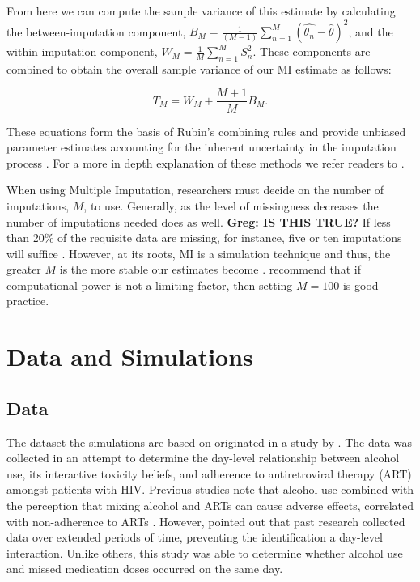 \documentclass{svjour3}\usepackage[]{graphicx}\usepackage[]{color}
\begin{document}
From here we can compute the sample variance of this estimate by calculating the between-imputation component, $B_M = \frac{1}{(M-1)}\sum_{n=1}^{M} (\widehat{\theta_n} - \widehat{\theta})^2$, and the within-imputation component, $W_M = \frac{1}{M}\sum_{n=1}^{M} S_n^2$. These components are combined to obtain the overall sample variance of our MI estimate as follows:

\begin{equation}
T_M = W_M + \frac{M+1}{M}B_M.
\end{equation}

These equations form the basis of Rubin's combining rules and provide unbiased parameter estimates accounting for the inherent uncertainty in the imputation process \citep{raghunathan2015missing}. For a more in depth explanation of these methods we refer readers to \citet{little2014statistical}. \par

When using Multiple Imputation, researchers must decide on the number of imputations, $M$, to use. Generally, as the level of missingness decreases the number of imputations needed does as well. \textbf{Greg: IS THIS TRUE?} If less than 20\% of the requisite data are missing, for instance, five or ten imputations will suffice \citep{raghunathan2015missing}. However, at its roots, MI is a simulation technique and thus, the greater $M$ is the more stable our estimates become \citep{harel2007inferences}. \citet{graham2007many} recommend that if computational power is not a limiting factor, then setting $M=100$ is good practice. \par

\section{Data and Simulations}
\label{sec:2}
\subsection{Data}
\label{sec:2.1}
The dataset the simulations are based on originated in a study by \citet{pellowski2016alcohol}. The data was collected in an attempt to determine the day-level relationship between alcohol use, its interactive toxicity beliefs, and adherence to antiretroviral therapy (ART) amongst patients with HIV. Previous studies note that alcohol use combined with the perception that mixing alcohol and ARTs can cause adverse effects, correlated with non-adherence to ARTs \citep{kalichman2009prevalence, kalichman2012alcohol}. However, \citet{pellowski2016alcohol} pointed out that past research collected data over extended periods of time, preventing the identification a day-level interaction. Unlike others, this study was able to determine whether alcohol use and missed medication doses occurred on the same day. \par
\end{document}
